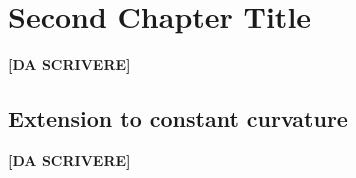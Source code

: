 \chapter{Second Chapter Title}
{\vspace{10pt}\LARGE \bf [DA SCRIVERE]}
\section{Extension to constant curvature}	
{\vspace{10pt}\LARGE \bf [DA SCRIVERE]}